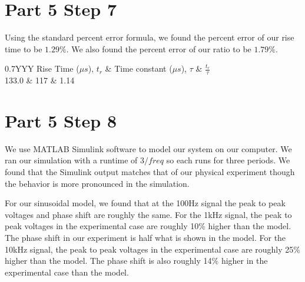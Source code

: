\documentclass[a4paper, 10pt]{article}
\begin{document}
\section*{Part 5 Step 7}
%
%
Using the standard percent error formula, we found the percent error of our rise time to be $1.29\%$. We also found the percent error of our ratio to be $1.79\%$.
\begin{table}[H]
	\centering
	\begin{tabularx}{0.7\linewidth}{YYY}
		Rise Time ($\mu s$), $t_r$ & Time constant ($\mu s$), $\tau$ & $\frac{t_r}{\tau}$\\
		133.0 & 117 & 1.14
	\end{tabularx}
	\caption{Theoretically modeled rise time, time constant, and ratio of rise time over time constant.}
	\label{tab:simulink_rise_time}
\end{table}
\section*{Part 5 Step 8}
%
%
We use MATLAB Simulink software to model our system on our computer. We ran our simulation with a runtime of $3/freq$ so each runs for three periods. We found that the Simulink output matches that of our physical experiment though the behavior is more pronounced in the simulation.

For our sinusoidal model, we found that at the 100Hz signal the peak to peak voltages and phase shift are roughly the same. For the 1kHz signal, the peak to peak voltages in the experimental case are roughly 10\% higher than the model. The phase shift in our experiment is half what is shown in the model. For the 10kHz signal, the peak to peak voltages in the experimental case are roughly 25\% higher than the model. The phase shift is also roughly 14\% higher in the experimental case than the model.
\end{document}
